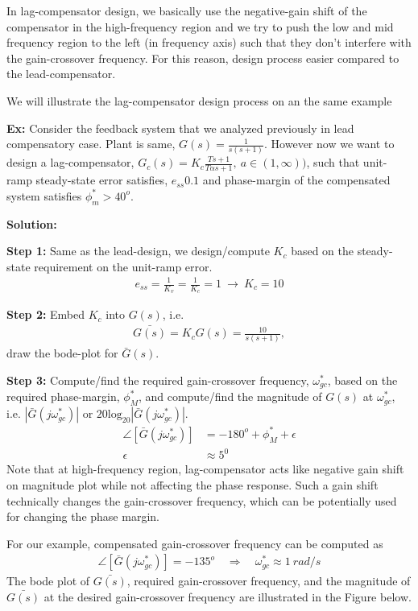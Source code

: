 \documentclass[twoside]{article}
\begin{document}
In lag-compensator design, we basically use the negative-gain shift of
the compensator in the high-frequency region and we try to push the
low and mid frequency region to the left (in frequency axis) such that 
they don't interfere with the gain-crossover frequency. For this
reason, design process easier compared to the lead-compensator. 

We will illustrate the lag-compensator design process on an the same example 

\vspace{6pt}

\textbf{Ex:} Consider the feedback system that we analyzed
previously in lead compensatory case. Plant is same, 
$G(s) = \frac{1}{s (s+1)}$. However now we want to
design a lag-compensator, $G_c(s) = K_c \frac{T s + 1}{T \alpha s + 1}
, \ a \in (1,\infty))$, such that unit-ramp steady-state error satisfies, $e_{ss}
0.1$ and phase-margin of the compensated system satisfies $\phi_m^*
> 40^o$. 

\textbf{Solution:}

\textbf{Step 1:} Same as the lead-design, we design/compute $K_c$ based on the steady-state 
requirement on the unit-ramp error.  
%
\begin{align}
   e_{ss} = \frac{1}{K_v} = \frac{1}{K_c} = 1 \ \rightarrow \ K_c = 10
\end{align}

\textbf{Step 2:} Embed $K_c$ into $G(s)$, i.e. 
%
\begin{align*}
  \bar{G(s)} = K_c G(s) = \frac{10}{s (s+1)} ,
\end{align*} 
%
draw the bode-plot for $\bar{G}(s)$. 

\textbf{Step 3:} Compute/find the required gain-crossover
frequency, $\omega_{gc}^*$, based on
the required phase-margin, $\phi^*_M$, and compute/find 
the magnitude of $G(s)$ at $\omega_{gc}^*$, i.e. 
$| \bar{G}(j  \omega_{gc}^*) | $ or $20 \mathrm{log}_20 | \bar{G}(j  \omega_{gc}^*) |$.
%
\begin{align*}
  \angle [ \bar{G}(j  \omega_{gc}^*) ] &= -180^o + \phi_M^* + \epsilon
  \\
  \epsilon &\approx 5^0
\end{align*}
%
Note that at high-frequency 
region, lag-compensator acts like negative gain 
shift on magnitude plot while not affecting the 
phase response. Such a gain shift technically 
changes the gain-crossover frequency, which
can be potentially used for changing the phase 
margin. 

For our example, compensated gain-crossover frequency can be computed as
%
\begin{align*}
  \angle [ \bar{G}(j  \omega_{gc}^*) ] = -135^o
  \quad \Rightarrow \quad \omega_{gc}^* \approx 1 \ rad/s
\end{align*}
%
The bode plot of $\bar{G(s)}$,
required gain-crossover frequency, and  
the magnitude of $\bar{G(s)}$ at the desired 
gain-crossover frequency are 
illustrated in the Figure below. 
\end{document}
